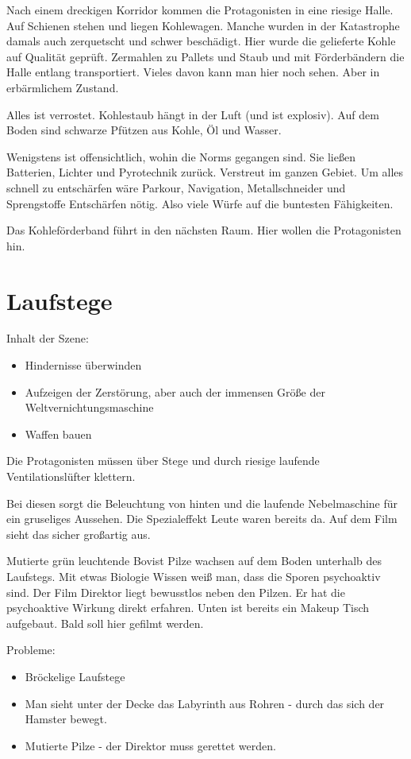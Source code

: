 Nach einem dreckigen Korridor kommen die Protagonisten in eine riesige Halle. Auf Schienen stehen und liegen Kohlewagen. Manche wurden in der Katastrophe damals auch zerquetscht und schwer beschädigt. Hier wurde die gelieferte Kohle auf Qualität geprüft. Zermahlen zu Pallets und Staub und mit Förderbändern die Halle entlang transportiert. Vieles davon kann man hier noch sehen. Aber in erbärmlichem Zustand.

Alles ist verrostet. Kohlestaub hängt in der Luft (und ist explosiv). Auf dem Boden sind schwarze Pfützen aus Kohle, Öl und Wasser.

Wenigstens ist offensichtlich, wohin die Norms gegangen sind. Sie ließen Batterien, Lichter und Pyrotechnik zurück. Verstreut im ganzen Gebiet. Um alles schnell zu entschärfen wäre Parkour, Navigation, Metallschneider und Sprengstoffe Entschärfen nötig. Also viele Würfe auf die buntesten Fähigkeiten.

Das Kohleförderband führt in den nächsten Raum. Hier wollen die Protagonisten hin.

\section{Laufstege}

Inhalt der Szene:
\begin{itemize}
\item Hindernisse überwinden
\item Aufzeigen der Zerstörung, aber auch der immensen Größe der Weltvernichtungsmaschine
\item Waffen bauen
\end{itemize}

Die Protagonisten müssen über Stege und durch riesige laufende Ventilationslüfter klettern.

Bei diesen sorgt die Beleuchtung von hinten und die laufende Nebelmaschine für ein gruseliges Aussehen. Die Spezialeffekt Leute waren bereits da. Auf dem Film sieht das sicher großartig aus.

Mutierte grün leuchtende Bovist Pilze wachsen auf dem Boden unterhalb des Laufstegs. Mit etwas Biologie Wissen weiß man, dass die Sporen psychoaktiv sind. Der Film Direktor liegt bewusstlos neben den Pilzen. Er hat die psychoaktive Wirkung direkt erfahren. Unten ist bereits ein Makeup Tisch aufgebaut. Bald soll hier gefilmt werden.

Probleme:
\begin{itemize}
\item Bröckelige Laufstege
\item Man sieht unter der Decke das Labyrinth aus Rohren - durch das sich der Hamster bewegt.
\item Mutierte Pilze - der Direktor muss gerettet werden.
\end{itemize}

